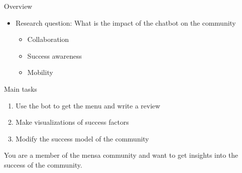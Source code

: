 \begin{frame}{Overview}
  \begin{itemize}
    \item Research question: What is the impact of the chatbot on the community
          \begin{itemize}
            \item Collaboration
            \item Success awareness
            \item Mobility
          \end{itemize}
  \end{itemize}
\end{frame}

\begin{frame}{Main tasks}
  \begin{enumerate}
    \item Use the bot to get the menu and write a review
    \item Make visualizations of success factors
    \item Modify the success model of the community
  \end{enumerate}
  
You are a member of the mensa community and want to get insights into the success of the community.

\end{frame}


